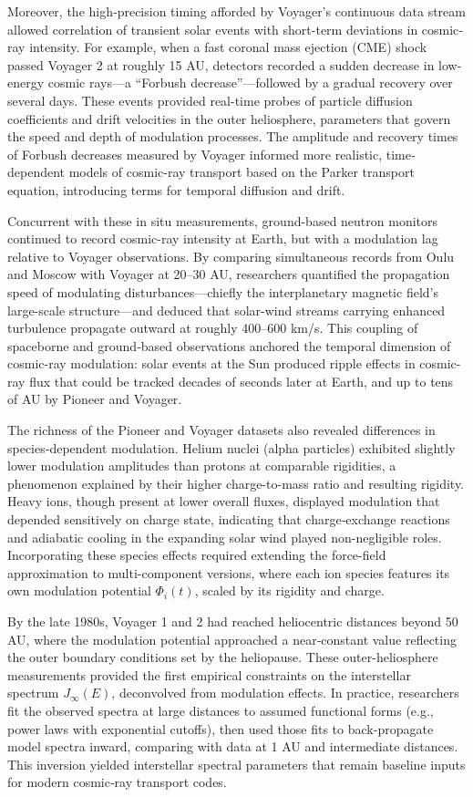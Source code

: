 \documentclass[12pt]{report}
\begin{document}
Moreover, the high‐precision timing afforded by Voyager’s continuous data stream allowed correlation of transient solar events with short-term deviations in cosmic‐ray intensity. For example, when a fast coronal mass ejection (CME) shock passed Voyager 2 at roughly 15 AU, detectors recorded a sudden decrease in low-energy cosmic rays—a “Forbush decrease”—followed by a gradual recovery over several days. These events provided real-time probes of particle diffusion coefficients and drift velocities in the outer heliosphere, parameters that govern the speed and depth of modulation processes. The amplitude and recovery times of Forbush decreases measured by Voyager informed more realistic, time‐dependent models of cosmic-ray transport based on the Parker transport equation, introducing terms for temporal diffusion and drift.

Concurrent with these in situ measurements, ground-based neutron monitors continued to record cosmic-ray intensity at Earth, but with a modulation lag relative to Voyager observations. By comparing simultaneous records from Oulu and Moscow with Voyager at 20–30 AU, researchers quantified the propagation speed of modulating disturbances—chiefly the interplanetary magnetic field’s large-scale structure—and deduced that solar-wind streams carrying enhanced turbulence propagate outward at roughly 400–600 km/s. This coupling of spaceborne and ground‐based observations anchored the temporal dimension of cosmic-ray modulation: solar events at the Sun produced ripple effects in cosmic-ray flux that could be tracked decades of seconds later at Earth, and up to tens of AU by Pioneer and Voyager.

The richness of the Pioneer and Voyager datasets also revealed differences in species‐dependent modulation. Helium nuclei (alpha particles) exhibited slightly lower modulation amplitudes than protons at comparable rigidities, a phenomenon explained by their higher charge-to-mass ratio and resulting rigidity. Heavy ions, though present at lower overall fluxes, displayed modulation that depended sensitively on charge state, indicating that charge‐exchange reactions and adiabatic cooling in the expanding solar wind played non-negligible roles. Incorporating these species effects required extending the force-field approximation to multi-component versions, where each ion species features its own modulation potential \(\Phi_i(t)\), scaled by its rigidity and charge.

By the late 1980s, Voyager 1 and 2 had reached heliocentric distances beyond 50 AU, where the modulation potential approached a near‐constant value reflecting the outer boundary conditions set by the heliopause. These outer-heliosphere measurements provided the first empirical constraints on the interstellar spectrum \(J_{\infty}(E)\), deconvolved from modulation effects. In practice, researchers fit the observed spectra at large distances to assumed functional forms (e.g., power laws with exponential cutoffs), then used those fits to back-propagate model spectra inward, comparing with data at 1 AU and intermediate distances. This inversion yielded interstellar spectral parameters that remain baseline inputs for modern cosmic‐ray transport codes.
\end{document}
